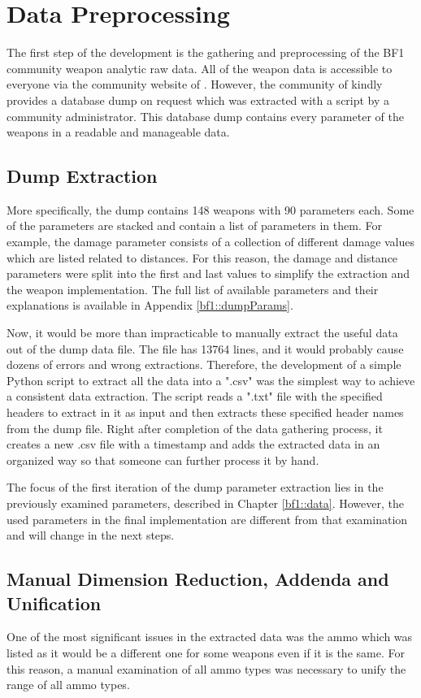 \documentclass[MGS,Master,english]{twbook}%
\begin{document}
\section{Data Preprocessing} \label{dev::dataPreprocessing}
The first step of the development is the gathering and preprocessing of the \ac{BF1} community weapon analytic raw data. All of the weapon data is accessible to everyone via the community website of \citep{symthic::bf1stats}. However, the community of  kindly provides a database dump on request which was extracted with a script by a community administrator. This database dump contains every parameter of the weapons in a readable and manageable data.

\subsection{Dump Extraction} \label{chapter::dumpExtraction}
More specifically, the dump contains 148 weapons with 90 parameters each. Some of the parameters are stacked and contain a list of parameters in them. For example, the damage parameter consists of a collection of different damage values which are listed related to distances. For this reason, the damage and distance parameters were split into the first and last values to simplify the extraction and the weapon implementation. The full list of available parameters and their explanations is available in Appendix \ref{bf1::dumpParams}.

Now, it would be more than impracticable to manually extract the useful data out of the dump data file. The file has 13764 lines, and it would probably cause dozens of errors and wrong extractions. Therefore, the development of a simple Python script to extract all the data into a ".csv" was the simplest way to achieve a consistent data extraction. The script reads a ".txt" file with the specified headers to extract in it as input and then extracts these specified header names from the dump file. Right after completion of the data gathering process, it creates a new .csv file with a timestamp and adds the extracted data in an organized way so that someone can further process it by hand.

The focus of the first iteration of the dump parameter extraction lies in the previously examined parameters, described in Chapter \ref{bf1::data}. However, the used parameters in the final implementation are different from that examination and will change in the next steps.

\subsection{Manual Dimension Reduction, Addenda and Unification}
One of the most significant issues in the extracted data was the ammo which was listed as it would be a different one for some weapons even if it is the same. For this reason, a manual examination of all ammo types was necessary to unify the range of all ammo types. 
\end{document}
